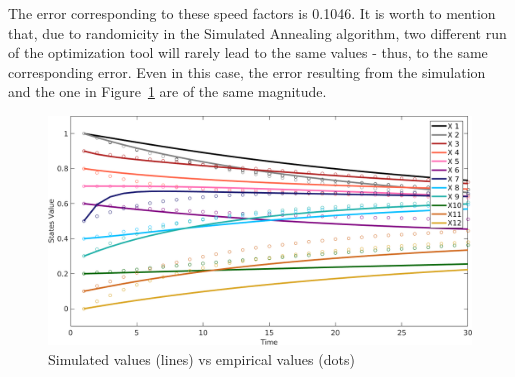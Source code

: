 \documentclass[a4paper]{article}
\begin{document}
The error corresponding to these speed factors is 0.1046. It is worth to mention that, due to randomicity in the Simulated Annealing algorithm, two different run of the optimization tool will rarely lead to the same values - thus, to the same corresponding error. Even in this case, the error resulting from the simulation and the one in Figure~\ref{fig:plotdiff2} are of the same magnitude.

\begin{figure}[H]
\center
\includegraphics[width=\textwidth]{res/img/plotdiff2_new}
\caption{Simulated values (lines) vs empirical values (dots)}
\label{fig:plotdiff2}
\end{figure}
\end{document}
